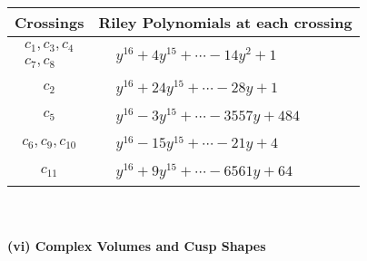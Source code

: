 \documentclass[1p]{elsarticle_modified}
\theoremstyle{definition}
\begin{document}
\begin{tabular}{m{50pt}|m{274pt}}
Crossings & \hspace{64pt}Riley Polynomials at each crossing \\
\hline $$\begin{aligned}c_{1},c_{3},c_{4}\\c_{7},c_{8}\end{aligned}$$&$\begin{aligned}
&y^{16}+4 y^{15}+\cdots-14 y^2+1
\end{aligned}$\\
\hline $$\begin{aligned}c_{2}\end{aligned}$$&$\begin{aligned}
&y^{16}+24 y^{15}+\cdots-28 y+1
\end{aligned}$\\
\hline $$\begin{aligned}c_{5}\end{aligned}$$&$\begin{aligned}
&y^{16}-3 y^{15}+\cdots-3557 y+484
\end{aligned}$\\
\hline $$\begin{aligned}c_{6},c_{9},c_{10}\end{aligned}$$&$\begin{aligned}
&y^{16}-15 y^{15}+\cdots-21 y+4
\end{aligned}$\\
\hline $$\begin{aligned}c_{11}\end{aligned}$$&$\begin{aligned}
&y^{16}+9 y^{15}+\cdots-6561 y+64
\end{aligned}$\\
\hline
\end{tabular}\\~\\
\newpage\flushleft \textbf{(vi) Complex Volumes and Cusp Shapes}
\end{document}
